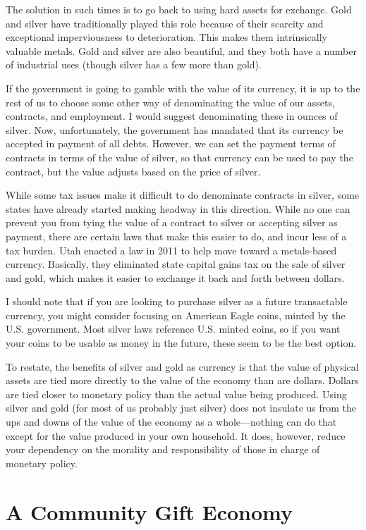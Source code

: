 The solution in such times is to go back to using hard assets for
exchange. Gold and silver have traditionally played this role because
of their scarcity and exceptional imperviousness to deterioration. This
makes them intrinsically valuable metals. Gold and silver are also
beautiful, and they both have a number of industrial uses (though
silver has a few more than gold).

If the government is going to gamble with the value of its currency, it
is up to the rest of us to choose some other way of denominating the
value of our assets, contracts, and employment. I would suggest
denominating these in ounces of silver. Now, unfortunately, the
government has mandated that its currency be accepted in payment of all
debts. However, we can set the payment terms of contracts in terms of
the value of silver, so that currency can be used to pay the contract,
but the value adjusts based on the price of silver. 

While some tax issues make it difficult to do denominate contracts in
silver, some states have already started making headway in this
direction. While no one can prevent you from tying the value of a
contract to silver or accepting silver as payment, there are certain
laws that make this easier to do, and incur less of a tax burden. Utah
enacted a law in 2011 to help move toward a metals-based currency.
Basically, they eliminated state capital gains tax on the sale of
silver and gold, which makes it easier to exchange it back and forth
between dollars.

I should note that if you are looking to purchase silver as a future
transactable currency, you might consider focusing on American Eagle
coins, minted by the U.S. government. Most silver laws reference U.S.
minted coins, so if you want your coins to be usable as money in the
future, these seem to be the best option.

To restate, the benefits of silver and gold as currency is that the
value of physical assets are tied more directly to the value of the
economy than are dollars.  Dollars are tied closer to monetary policy
than the actual value being produced. Using silver and gold (for most
of us probably just silver) does not insulate us from the ups and downs
of the value of the economy as a whole—nothing can do that except for
the value produced in your own household. It does, however, reduce your
dependency on the morality and responsibility of those in charge of
monetary policy.

\section{A Community Gift Economy}

